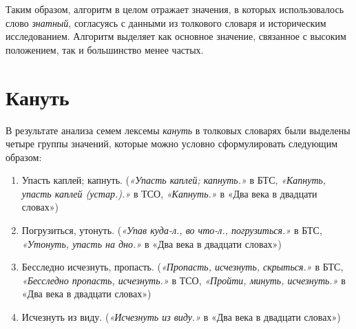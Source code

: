 Таким образом, алгоритм в целом отражает значения, в которых использовалось
слово \textit{знатный}, согласуясь с данными из толкового словаря и историческим исследованием.
Алгоритм выделяет как основное значение, связанное с высоким положением, так и большинство
менее частых.

\section*{Кануть}

В результате анализа семем лексемы \textit{кануть} в толковых словарях были выделены четыре группы значений,
которые можно условно сформулировать следующим образом:

\begin{enumerate}
    \item Упасть каплей; капнуть.
    (\textit{«Упасть каплей; капнуть.»} в БТС,
    \textit{«Капнуть, упасть каплей (устар.).»} в ТСО,
    \textit{«Капнуть.»} в «Два века в двадцати словах»)

    \item Погрузиться, утонуть.
    (\textit{«Упав куда-л., во что-л., погрузиться.»} в БТС,
    \textit{«Утонуть, упасть на дно.»} в «Два века в двадцати словах»)

    \item Бесследно исчезнуть, пропасть.
    (\textit{«Пропасть, исчезнуть, скрыться.»} в БТС,
    \textit{«Бесследно пропасть, исчезнуть.»} в ТСО,
    \textit{«Пройти, минуть, исчезнуть.»} в «Два века в двадцати словах»)

    \item Исчезнуть из виду.
    (\textit{«Исчезнуть из виду.»} в «Два века в двадцати словах»)
\end{enumerate}

%

